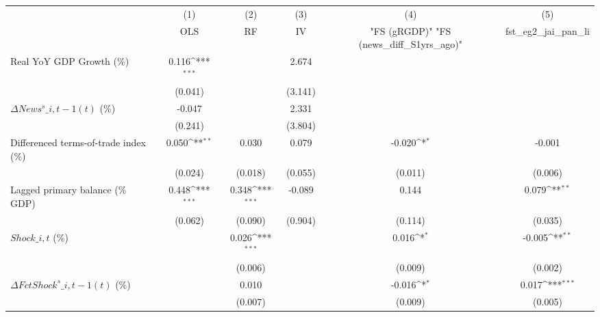 {
\def\sym#1{\ifmmode^{#1}\else\(^{#1}\)\fi}
\begin{tabular}{l*{5}{c}}
\toprule
                    &\multicolumn{1}{c}{(1)}&\multicolumn{1}{c}{(2)}&\multicolumn{1}{c}{(3)}&\multicolumn{1}{c}{(4)}&\multicolumn{1}{c}{(5)}\\
                    &\multicolumn{1}{c}{OLS}&\multicolumn{1}{c}{RF}&\multicolumn{1}{c}{IV}&\multicolumn{1}{c}{ "FS (gRGDP)"  "FS (news\_diff\_S1yrs\_ago)" }&\multicolumn{1}{c}{fst\_eg2\_jai\_pan\_li}\\
\midrule
Real YoY GDP Growth (\%)&       0.116\sym{***}&                     &       2.674         &                     &                     \\
                    &     (0.041)         &                     &     (3.141)         &                     &                     \\
\addlinespace
$ \Delta News^s\_{i,t-1}(t)$ (\%)&      -0.047         &                     &       2.331         &                     &                     \\
                    &     (0.241)         &                     &     (3.804)         &                     &                     \\
\addlinespace
Differenced terms-of-trade index (\%)&       0.050\sym{**} &       0.030         &       0.079         &      -0.020\sym{*}  &      -0.001         \\
                    &     (0.024)         &     (0.018)         &     (0.055)         &     (0.011)         &     (0.006)         \\
\addlinespace
Lagged primary balance (\% GDP)&       0.448\sym{***}&       0.348\sym{***}&      -0.089         &       0.144         &       0.079\sym{**} \\
                    &     (0.062)         &     (0.090)         &     (0.904)         &     (0.114)         &     (0.035)         \\
\addlinespace
$ Shock\_{i,t}$ (\%) &                     &       0.026\sym{***}&                     &       0.016\sym{*}  &      -0.005\sym{**} \\
                    &                     &     (0.006)         &                     &     (0.009)         &     (0.002)         \\
\addlinespace
$ \Delta FctShock^s\_{i,t-1}(t)$ (\%)&                     &       0.010         &                     &      -0.016\sym{*}  &       0.017\sym{***}\\
                    &                     &     (0.007)         &                     &     (0.009)         &     (0.005)         \\

\end{tabular}}
